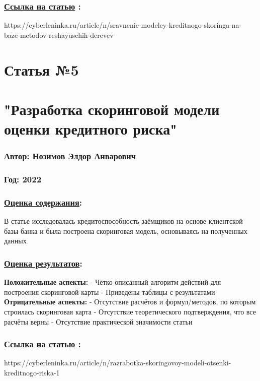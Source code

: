 \documentclass[a4paper,14pt]{article}
\begin{document}
\subsubsection*{\underline{Ссылка на статью} :}
https://cyberleninka.ru/article/n/sravnenie-modeley-kreditnogo-skoringa-na-baze-metodov-reshayuschih-derevev





\newpage
\section*{Статья №5}
\section*{"Разработка скоринговой модели оценки кредитного риска"}
\subsubsection*{Автор: Нозимов Элдор Анварович}
\subsubsection*{Год: 2022}
\subsubsection*{\underline{Оценка содержания}:}
В статье исследовалась кредитоспособность заёмщиков на основе клиентской базы банка и была построена скоринговая модель, основываясь на полученных данных
\subsubsection*{\underline{Оценка результатов}:}
\textbf{Положительные аспекты:} \newline
- Чётко описанный алгоритм действий для построения скоринговой карты \newline
- Приведены таблицы с результатами \newline
\textbf{Отрицательные аспекты:} \newline
- Отсутствие расчётов и формул/методов, по которым строилась скоринговая карта \newline
- Отсутствие теоретического подтверждения, что все расчёты верны \newline
- Отсутствие практической значимости статьи \newline

\subsubsection*{\underline{Ссылка на статью} :}
https://cyberleninka.ru/article/n/razrabotka-skoringovoy-modeli-otsenki-kreditnogo-riska-1
\end{document}
